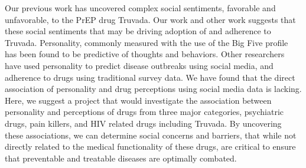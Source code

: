 Our previous work has uncovered complex social sentiments, favorable and unfavorable, to the PrEP drug Truvada. Our work and other work suggests that these social sentiments that may be driving adoption of and adherence to Truvada. Personality, commonly measured with the use of the Big Five profile has been found to be predictive of thoughts and behaviors. Other researchers have used personality to predict disease outbreaks using social media, and adherence to drugs using traditional survey data. We have found that the direct association of personality and drug perceptions using social media data is lacking. Here, we suggest a project that would investigate the association between personality and perceptions of drugs from three major categories, psychiatric drugs, pain killers, and HIV related drugs including Truvada. By uncovering these associations, we can determine social concerns and barriers, that while not directly related to the medical functionality of these drugs, are critical to ensure that preventable and treatable diseases are optimally combated.